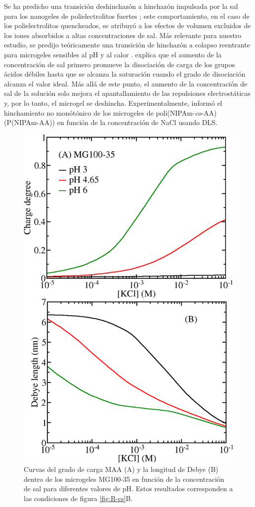 Se ha predicho una transici\'on deshinchaz\'on a hinchaz\'on impulsada por la sal para los nanogeles de polielectrolitos fuertes ;
este comportamiento, en el caso de los polielectrolitos quencheados, se atribuy\'o a los efectos de volumen excluidos de los iones absorbidos a altas concentraciones de sal.
M\'as relevante para nuestro estudio, se predijo te\'oricamente una transici\'on de hinchaz\'on a colapso reentrante para microgeles sensibles al pH y al calor .
 explica que el aumento de la concentraci\'on de sal primero promueve la disociaci\'on de carga de los grupos \'acidos d\'ebiles hasta que se alcanza la saturaci\'on cuando el grado de disociaci\'on alcanza el valor ideal.
M\'as all\'a de este punto, el aumento de la concentraci\'on de sal de la soluci\'on solo mejora el apantallamiento de las repulsiones electrost\'aticas y, por lo tanto, el microgel se deshincha.
Experimentalmente,  inform\'o el hinchamiento no mon\'otónico de los microgeles de poli(NIPAm-\emph{co}-AA) (P(NIPAm-AA)) en funci\'on de la concentraci\'on de NaCl usando DLS.

\begin{figure}[!tb]
	\centering
	\includegraphics[width=0.5\linewidth]{Figures/graph-gel/f-cs.png}
	\caption{Curvas del grado de carga MAA (A) y la longitud de Debye (B) dentro de los microgeles MG100-35 en funci\'on de la concentraci\'on de sal para diferentes valores de pH.
		Estos resultados corresponden a las condiciones de figura \ref{fig:R-cs}B.}
	\label{fig:f-cs}
\end{figure}



